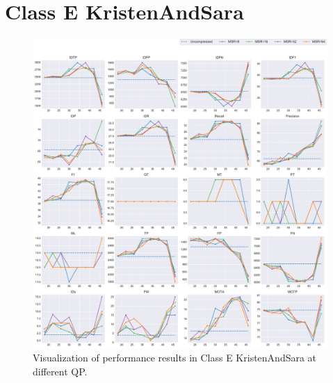 
\section{Class E KristenAndSara}
\label{sec:appendix/KristenAndSara_all}


\begin{figure}[!htbp]
\centering
\includegraphics[width=1.0\linewidth]{img/appendix/KristenAndSara_all_multiplots_qp.pdf}
\caption[Visualization of performance results in Class E KristenAndSara at different QP]
{Visualization of performance results in Class E KristenAndSara at different QP.}
\label{fig:KristenAndSara_all_qp}
\end{figure}

